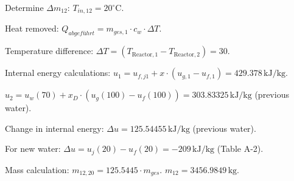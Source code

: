Determine \( \Delta m_{12} \):  
\( T_{in,12} = 20^\circ \text{C} \).

Heat removed:  
\( Q_{abgeführt} = m_{ges,1} \cdot c_w \cdot \Delta T \).

Temperature difference:  
\( \Delta T = (T_{\text{Reactor},1} - T_{\text{Reactor},2}) = 30 \).

Internal energy calculations:  
\( u_1 = u_{f,j1} + x \cdot (u_{g,1} - u_{f,1}) = 429.378 \, \text{kJ/kg} \).  

\( u_2 = u_w(70) + x_D \cdot (u_g(100) - u_f(100)) = 303.83325 \, \text{kJ/kg} \) (previous water).  

Change in internal energy:  
\( \Delta u = 125.54455 \, \text{kJ/kg} \) (previous water).  

For new water:  
\( \Delta u = u_j(20) - u_f(20) = -209 \, \text{kJ/kg} \) (Table A-2).  

Mass calculation:  
\( m_{12,20} = 125.5445 \cdot m_{ges} \).  
\( m_{12} = 3456.9849 \, \text{kg} \).